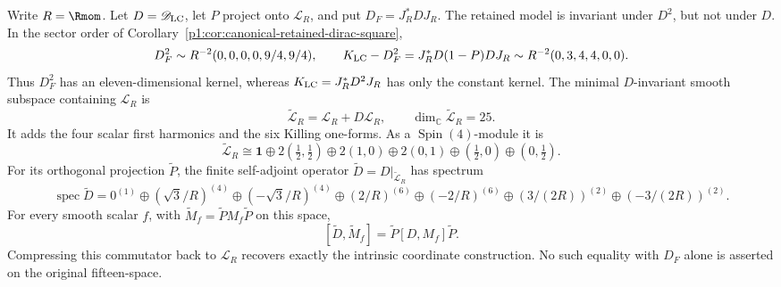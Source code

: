 \documentclass[11pt]{article}
\begin{document}
\begin{theorem}
\label{p1:thm:v214-first-order-retained-closure}
Write \(R=\Rmom\). Let \(D=\mathscr D_{\rm LC}\), let \(P\) project onto
\(\mathcal L_R\), and put \(D_F=J_R^*DJ_R\).
The retained model is invariant under \(D^2\), but not under \(D\).
In the sector order of
Corollary~\ref{p1:cor:canonical-retained-dirac-square},
\[
 D_F^2\sim R^{-2}(0,0,0,0,9/4,9/4),\qquad
 K_{\rm LC}-D_F^2
 =J_R^*D(1-P)DJ_R
 \sim R^{-2}(0,3,4,4,0,0).
\]
Thus \(D_F^2\) has an eleven-dimensional kernel, whereas
\(K_{\rm LC}=J_R^*D^2J_R\) has only the constant kernel.
The minimal \(D\)-invariant smooth subspace containing \(\mathcal L_R\) is
\[
 \widetilde{\mathcal L}_R=\mathcal L_R+D\mathcal L_R,\qquad
 \dim_{\mathbb C}\widetilde{\mathcal L}_R=25.
\]
It adds the four scalar first harmonics and the six Killing one-forms.
As a \(\operatorname{Spin}(4)\)-module it is
\[
 \widetilde{\mathcal L}_R\cong
 \mathbf1\oplus2(\tfrac12,\tfrac12)
 \oplus2(1,0)\oplus2(0,1)
 \oplus(\tfrac12,0)\oplus(0,\tfrac12).
\]
For its orthogonal projection \(\widetilde P\), the finite self-adjoint
operator \(\widetilde D=D|_{\widetilde{\mathcal L}_R}\) has spectrum
\[
 \operatorname{spec}\widetilde D
 =0^{(1)}\oplus(\sqrt3/R)^{(4)}
 \oplus(-\sqrt3/R)^{(4)}
 \oplus(2/R)^{(6)}\oplus(-2/R)^{(6)}
 \oplus(3/(2R))^{(2)}\oplus(-3/(2R))^{(2)}.
\]
For every smooth scalar \(f\), with
\(\widetilde M_f=\widetilde P M_f\widetilde P\) on this space,
\[
 [\widetilde D,\widetilde M_f]
 =\widetilde P[D,M_f]\widetilde P.
\]
Compressing this commutator back to \(\mathcal L_R\) recovers exactly
the intrinsic coordinate construction. No such equality with \(D_F\)
alone is asserted on the original fifteen-space.
\end{theorem}
\end{document}
